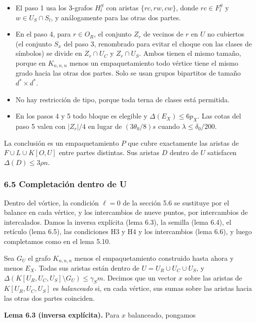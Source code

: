 \documentclass[spanish,11pt,a4paper]{article}
\providecommand{\tightlist}{\setlength{\itemsep}{0pt}\setlength{\parskip}{0pt}}
\begin{document}
\begin{itemize}
\tightlist
\item
  El paso 1 usa los 3-grafos \(H^S_l\) con aristas \(\{rc,rw,cw\}\), donde \(rc\in F^S_l\) y \(w\in U_S\cap S_l\), y análogamente para las otras dos partes.
\item
  En el paso 4, para \(r\in O_R\), el conjunto \(Z_r\) de vecinos de \(r\) en \(U\) no cubiertos (el conjunto \(S_x\) del paso 3, renombrado para evitar el choque con las clases de símbolos) se divide en \(Z_r\cap U_C\) y \(Z_r\cap U_S\). Ambos tienen el mismo tamaño, porque en \(K_{n,n,n}\) menos un empaquetamiento todo vértice tiene el mismo grado hacia las otras dos partes. Solo se usan grupos bipartitos de tamaño \(d^*\times d^*\).
\item
  No hay restricción de tipo, porque toda terna de clases está permitida.
\item
  En los pasos 4 y 5 todo bloque es elegible y \(\Delta(E_X)\le6p_X\). Las cotas del paso 5 valen con \(|Z_r|/4\) en lugar de \((3\theta_0/8)s\) cuando \(\lambda\le\delta_0/200\).
\end{itemize}

La conclusión es un empaquetamiento \(P\) que cubre exactamente las aristas de \(F\cup L\cup K[O,U]\) entre partes distintas. Sus aristas \(D\) dentro de \(U\) satisfacen \(\Delta(D)\le3\rho n\).

\subsubsection{6.5 Completación dentro de U}\label{completaciuxf3n-dentro-de-u-1}

Dentro del vórtice, la condición \(\ell=0\) de la sección 5.6 se sustituye por el balance en cada vértice, y los intercambios de nueve puntos, por intercambios de intercalados. Damos la inversa explícita (lema 6.3), la semilla (lema 6.4), el retículo (lema 6.5), las condiciones H3 y H4 y los intercambios (lema 6.6), y luego completamos como en el lema 5.10.

Sea \(G_U\) el grafo \(K_{n,n,n}\) menos el empaquetamiento construido hasta ahora y menos \(E_X\). Todas sus aristas están dentro de \(U=U_R\cup U_C\cup U_S\), y \(\Delta(K[U_R,U_C,U_S]\setminus G_U)\le\gamma_Sm\). Decimos que un vector \(x\) sobre las aristas de \(K[U_R,U_C,U_S]\) es \emph{balanceado} si, en cada vértice, sus sumas sobre las aristas hacia las otras dos partes coinciden.

\textbf{Lema 6.3 (inversa explícita).} Para \(x\) balanceado, pongamos
\end{document}
